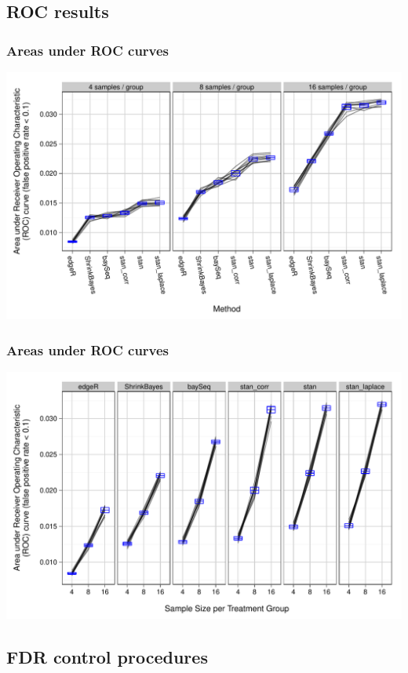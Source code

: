 \documentclass[handout]{beamer}
\numberwithin{equation}{section}
\begin{document}
\subsection{ROC results}

\begin{frame}
\frametitle{Areas under ROC curves}
\begin{center}
\includegraphics[scale=0.5]{auc1}
\end{center}
\end{frame}

\begin{frame}
\frametitle{Areas under ROC curves}
\begin{center}
\includegraphics[scale=0.5]{auc2}
\end{center}
\end{frame}


\subsection{FDR control procedures}
\end{document}
